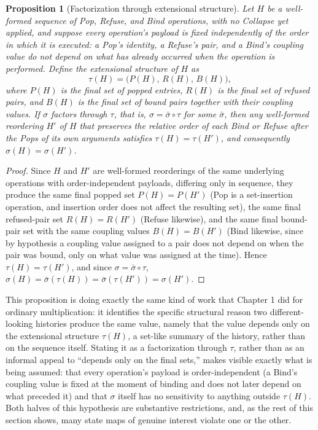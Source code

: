 \documentclass[11pt]{book}
\newtheorem{proposition}[theorem]{Proposition}
\begin{document}
\begin{proposition}[Factorization through extensional structure]
\label{prop:pop-refuse-bind-commute}
Let $H$ be a well-formed sequence of Pop, Refuse, and Bind operations, with no Collapse yet applied, and suppose every operation's payload is fixed independently of the order in which it is executed: a Pop's identity, a Refuse's pair, and a Bind's coupling value do not depend on what has already occurred when the operation is performed. Define the \emph{extensional structure} of $H$ as
\[
\tau(H) = \bigl(P(H),\,R(H),\,B(H)\bigr),
\]
where $P(H)$ is the final set of popped entries, $R(H)$ is the final set of refused pairs, and $B(H)$ is the final set of bound pairs together with their coupling values. If $\sigma$ factors through $\tau$, that is, $\sigma=\bar\sigma\circ\tau$ for some $\bar\sigma$, then any well-formed reordering $H'$ of $H$ that preserves the relative order of each Bind or Refuse after the Pops of its own arguments satisfies $\tau(H)=\tau(H')$, and consequently $\sigma(H)=\sigma(H')$.
\end{proposition}
\begin{proof}
Since $H$ and $H'$ are well-formed reorderings of the same underlying operations with order-independent payloads, differing only in sequence, they produce the same final popped set $P(H)=P(H')$ (Pop is a set-insertion operation, and insertion order does not affect the resulting set), the same final refused-pair set $R(H)=R(H')$ (Refuse likewise), and the same final bound-pair set with the same coupling values $B(H)=B(H')$ (Bind likewise, since by hypothesis a coupling value assigned to a pair does not depend on when the pair was bound, only on what value was assigned at the time). Hence $\tau(H)=\tau(H')$, and since $\sigma=\bar\sigma\circ\tau$, $\sigma(H)=\bar\sigma(\tau(H))=\bar\sigma(\tau(H'))=\sigma(H')$.
\end{proof}

This proposition is doing exactly the same kind of work that Chapter 1 did for ordinary multiplication: it identifies the specific structural reason two different-looking histories produce the same value, namely that the value depends only on the extensional structure $\tau(H)$, a set-like summary of the history, rather than on the sequence itself. Stating it as a factorization through $\tau$, rather than as an informal appeal to ``depends only on the final sets,'' makes visible exactly what is being assumed: that every operation's payload is order-independent (a Bind's coupling value is fixed at the moment of binding and does not later depend on what preceded it) and that $\sigma$ itself has no sensitivity to anything outside $\tau(H)$. Both halves of this hypothesis are substantive restrictions, and, as the rest of this section shows, many state maps of genuine interest violate one or the other.
\end{document}
